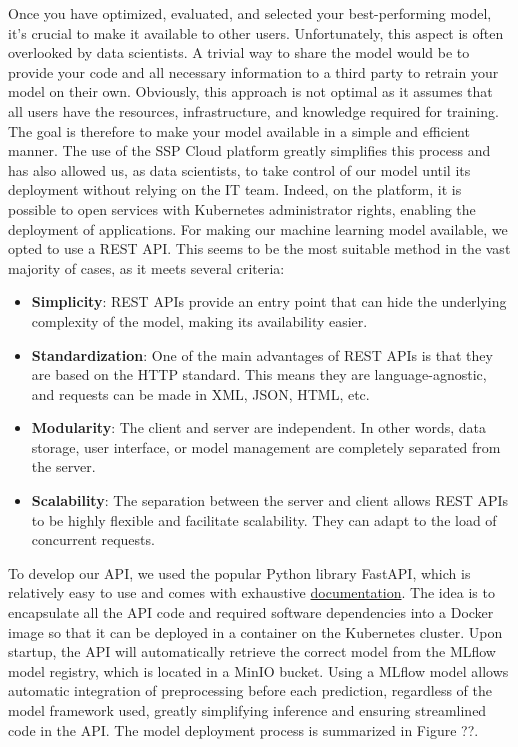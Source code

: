Once you have optimized, evaluated, and selected your best-performing model, it's crucial to make it available to other users. Unfortunately, this aspect is often overlooked by data scientists. A trivial way to share the model would be to provide your code and all necessary information to a third party to retrain your model on their own. Obviously, this approach is not optimal as it assumes that all users have the resources, infrastructure, and knowledge required for training. The goal is therefore to make your model available in a simple and efficient manner. The use of the SSP Cloud platform greatly simplifies this process and has also allowed us, as data scientists, to take control of our model until its deployment without relying on the IT team. Indeed, on the platform, it is possible to open services with Kubernetes administrator rights, enabling the deployment of applications. For making our machine learning model available, we opted to use a REST API. This seems to be the most suitable method in the vast majority of cases, as it meets several criteria:

\begin{itemize}
    \item \textbf{Simplicity}: REST APIs provide an entry point that can hide the underlying complexity of the model, making its availability easier.
    \item \textbf{Standardization}: One of the main advantages of REST APIs is that they are based on the HTTP standard. This means they are language-agnostic, and requests can be made in XML, JSON, HTML, etc.
    \item \textbf{Modularity}: The client and server are independent. In other words, data storage, user interface, or model management are completely separated from the server.
    \item \textbf{Scalability}: The separation between the server and client allows REST APIs to be highly flexible and facilitate scalability. They can adapt to the load of concurrent requests.
\end{itemize}

To develop our API, we used the popular Python library FastAPI, which is relatively easy to use and comes with exhaustive \href{https://fastapi.tiangolo.com/}{documentation}. The idea is to encapsulate all the API code and required software dependencies into a Docker image so that it can be deployed in a container on the Kubernetes cluster. Upon startup, the API will automatically retrieve the correct model from the MLflow model registry, which is located in a MinIO bucket. Using a MLflow model allows automatic integration of preprocessing before each prediction, regardless of the model framework used, greatly simplifying inference and ensuring streamlined code in the API. The model deployment process is summarized in Figure ??.

